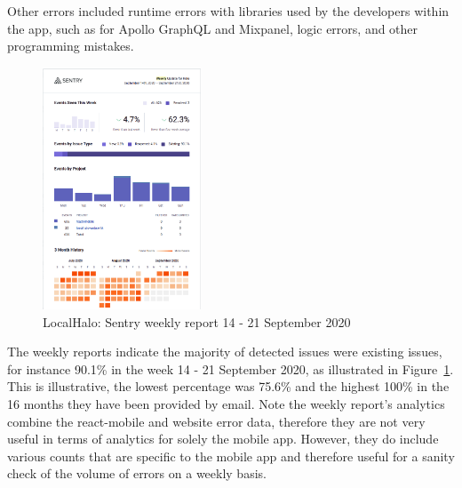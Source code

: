 Other errors included runtime errors with libraries used by the developers within the app, such as for Apollo GraphQL and Mixpanel, logic errors, and other programming mistakes. 


\begin{figure}
  \begin{center}
    \includegraphics[width=0.42\textwidth]{images/localhalo/sentry-weekly-report-21-Sep-2020.png}
  \end{center}
  \caption{LocalHalo: Sentry weekly report 14 - 21 September 2020}
  \label{fig:localhalo-sentry-weekly-report-21-sep-2020}
\end{figure}

The weekly reports indicate the majority of detected issues were existing issues, for instance 90.1\% in the week 14 - 21 September 2020, as illustrated in Figure~\ref{fig:localhalo-sentry-weekly-report-21-sep-2020}. This is illustrative, the lowest percentage was 75.6\% and the highest 100\% in the 16 months they have been provided by email. Note the weekly report's analytics combine the react-mobile and website error data, therefore they are not very useful in terms of analytics for solely the mobile app. However, they do include various counts that are specific to the mobile app and therefore useful for a sanity check of the volume of errors on a weekly basis.

